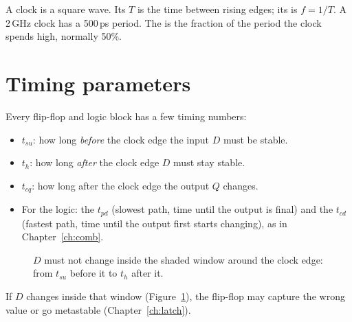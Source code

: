 A clock is a square wave. Its  $T$ is the time between rising edges; its  is $f = 1/T$. A 2\,GHz clock has a 500\,ps period. The  is the fraction of the period the clock spends high, normally 50\%.

\section{Timing parameters}

Every flip-flop and logic block has a few timing numbers:

\begin{itemize}
  \item {} $t_{su}$: how long \emph{before} the clock edge the input $D$ must be stable.
  \item {} $t_h$: how long \emph{after} the clock edge $D$ must stay stable.
  \item {} $t_{cq}$: how long after the clock edge the output $Q$ changes.
  \item For the logic: the  $t_{pd}$ (slowest path, time until the output is final) and the  $t_{cd}$ (fastest path, time until the output first starts changing), as in Chapter~\ref{ch:comb}.
\end{itemize}

\begin{figure}[h]
\centering
{}
\caption{$D$ must not change inside the shaded window around the clock edge: from $t_{su}$ before it to $t_h$ after it.}
\label{fig:window}
\end{figure}

If $D$ changes inside that window (Figure~\ref{fig:window}), the flip-flop may capture the wrong value or go metastable (Chapter~\ref{ch:latch}).

